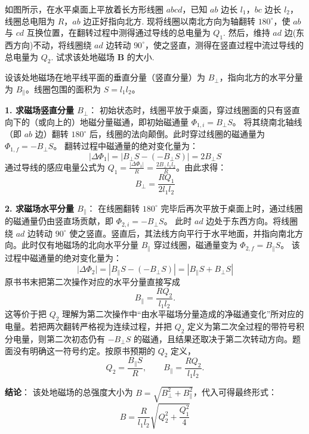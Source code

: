 
\begin{exercise}\label{ex:18.9}
如图所示，在水平桌面上平放着长方形线圈 $abcd$，已知 $ab$ 边长 $l_1$，$bc$ 边长 $l_2$，线圈总电阻为 $R$，$ab$ 边正好指向北方. 现将线圈以南北方向为轴翻转 $180^\circ$，使 $ab$ 与 $cd$ 互换位置，在翻转过程中测得通过导线的总电量为 $Q_1$. 然后，维持 $ad$ 边(东西方向)不动，将线圈绕 $ad$ 边转动 $90^\circ$，使之竖直，测得在竖直过程中流过导线的总电量为 $Q_2$. 试求该处地磁场 $\boldsymbol{B}$ 的大小.
\begin{center}
\end{center}
\end{exercise}
\begin{solution}
设该处地磁场在地平线平面的垂直分量（竖直分量）为 $B_{\perp}$，指向北方的水平分量为 $B_{\parallel}$。线圈包围的面积为 $S = l_1 l_2$。

\textbf{1. 求磁场竖直分量 $B_{\perp}$}：
初始状态时，线圈平放于桌面，穿过线圈面的只有竖直向下的（或向上的）地磁分量磁通，即初始磁通量 $\Phi_{1, i} = B_{\perp} S$。
将其绕南北轴线（即 $ab$ 边）翻转 $180^\circ$ 后，线圈的法向颠倒。此时穿过线圈的磁通量为 $\Phi_{1, f} = -B_{\perp} S$。
翻转过程中磁通量的绝对变化量为：
$$ |\Delta \Phi_1| = |B_{\perp} S - (-B_{\perp} S)| = 2 B_{\perp} S $$
通过导线的感应电量公式为 $Q_1 = \frac{|\Delta \Phi_1|}{R} = \frac{2 B_{\perp} l_1 l_2}{R}$。由此求得：
$$ B_{\perp} = \frac{R Q_1}{2 l_1 l_2} $$

\textbf{2. 求磁场水平分量 $B_{\parallel}$}：
在线圈翻转 $180^\circ$ 完毕后再次平放于桌面上时，通过线圈的磁通量仍由竖直场贡献，即 $\Phi_{2, i} = -B_{\perp} S$。
此时 $ad$ 边处于东西方向。将线圈绕 $ad$ 边转动 $90^\circ$ 使之竖直。竖直后，其法线方向平行于水平地面，并指向南北方向。此时仅有地磁场的北向水平分量 $B_{\parallel}$ 穿过线圈，磁通量变为 $\Phi_{2, f} = B_{\parallel} S$。
该过程中磁通量的绝对变化量为：
$$ |\Delta \Phi_2| = |B_{\parallel} S - (-B_{\perp} S)| = |B_{\parallel} S + B_{\perp} S| $$
原书书末把第二次操作对应的水平分量直接写成
$$ B_{\parallel}=\frac{RQ_2}{l_1l_2}. $$
这等价于把 $Q_2$ 理解为第二次操作中“由水平磁场分量造成的净磁通变化”所对应的电量。若把两次翻转严格视为连续过程，并把 $Q_2$ 定义为第二次全过程的带符号积分电量，则第二次初态仍有 $-B_{\perp}S$ 的磁通，且结果还取决于第二次转动方向。题面没有明确这一符号约定。按原书预期的 $Q_2$ 定义，
$$ Q_2=\frac{B_{\parallel}S}{R},\qquad B_{\parallel}=\frac{RQ_2}{l_1l_2}. $$

\textbf{结论}：
该处地磁场的总强度大小为 $B = \sqrt{B_{\perp}^2 + B_{\parallel}^2}$，代入可得最终形式：
$$ B = \frac{R}{l_1 l_2} \sqrt{ Q_2^2 + \frac{Q_1^2}{4} } $$
\end{solution}

